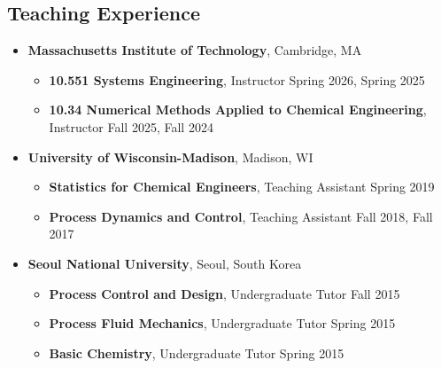 \subsection*{Teaching Experience}
\begin{itemize}[itemsep=1pt, parsep=0pt,leftmargin=*]
\item[] \textbf{Massachusetts Institute of Technology}, Cambridge, MA
  \begin{itemize}[leftmargin=*,itemsep=0pt]
  \item[] \textbf{10.551 Systems Engineering}, Instructor \hfill Spring 2026, Spring 2025 
  \item[] \textbf{10.34 Numerical Methods Applied to Chemical Engineering}, Instructor \hfill Fall 2025, Fall 2024
  \end{itemize}
\item[] \textbf{University of Wisconsin-Madison}, Madison, WI
  \begin{itemize}[leftmargin=*,itemsep=0pt]
  \item[] \textbf{Statistics for Chemical Engineers}, Teaching Assistant \hfill Spring 2019
  \item[] \textbf{Process Dynamics and Control}, Teaching Assistant \hfill  Fall 2018, Fall 2017
  \end{itemize}
\item[] \textbf{Seoul National University}, Seoul, South Korea
  \begin{itemize}[leftmargin=*,itemsep=0pt]
  \item[] \textbf{Process Control and Design}, Undergraduate Tutor \hfill  Fall 2015
  \item[] \textbf{Process Fluid Mechanics}, Undergraduate Tutor \hfill Spring 2015
  \item[] \textbf{Basic Chemistry}, Undergraduate Tutor \hfill Spring 2015
  \end{itemize}
\end{itemize}


